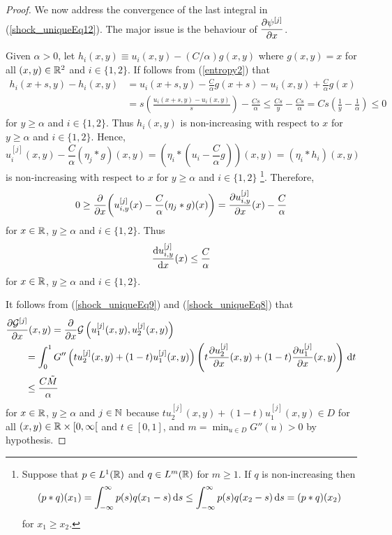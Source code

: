 \begin{proof}
 We now address the convergence of the last integral in
(\ref{shock_uniqueEq12}).  The major issue is the behaviour of
$\displaystyle \pdydx{\psi^{[j]}}{x}$.

Given $\alpha > 0$, let $h_i(x,y) \equiv u_i(x,y) - (C/\alpha) g(x,y)$ where 
$g(x,y) = x$ for all $(x,y) \in \RR^2$ and $i \in\{1,2\}$.  If follows from
(\ref{entropy2}) that
\begin{align*}
h_i(x+s,y) - h_i(x,y)
&= u_i(x+s,y) - \frac{C}{\alpha} g(x+s)
- u_i(x,y) + \frac{C}{\alpha} g(x) \\
&= s\left( \frac{u_i(x+s,y) - u_i(x,y)}{s}\right) - \frac{C s}{\alpha}
\leq \frac{C s}{y} - \frac{C s}{\alpha}
= C s\left( \frac{1}{y} - \frac{1}{\alpha}\right) \leq 0
\end{align*}
for $y\geq \alpha$ and $i \in \{1,2\}$.  Thus $h_i(x,y)$ is non-increasing
with respect to $x$ for $y\geq \alpha$ and $i \in \{1,2\}$.  Hence,
\[
u_i^{[j]}(x,y) - \frac{C}{\alpha} (\eta_j \ast g)(x,y)
= \left(\eta_i \ast ( u_i- \frac{C}{\alpha} g)\right)(x,y)
= \left(\eta_i \ast h_i\right)(x,y)
\]
is non-increasing with respect to $x$ for $y \geq \alpha$ and
$i \in \{1,2\}$ \footnote{
Suppose that $p \in L^1(\RR)$ and $q \in L^m(\RR)$ for $m \geq 1$. 
If $q$ is non-increasing then
\[
(p\ast q)(x_1) = \int_{-\infty}^\infty p(s) q(x_1-s) \dx{s}
\leq \int_{-\infty}^\infty p(s) q(x_2-s) \dx{s}
= (p\ast q)(x_2)
\]
for $x_1 \geq x_2$.}.
Therefore,
\[
0 \geq \pdfdx{\left( u_{i,y}^{[j]}(x) - \frac{C}{\alpha} (\eta_j \ast g)(x)
\right)}{x}
= \pdydx{u_{i,y}^{[j]}}{x}(x) - \frac{C}{\alpha}
\]
for $x \in \RR$, $y\geq \alpha$ and $i \in \{1,2\}$.  Thus
\begin{equation} \label{shock_uniqueEq8}
 \dydx{u_{i,y}^{[j]}}{x}(x) \leq \frac{C}{\alpha}
\end{equation}
for $x \in \RR$, $y \geq \alpha$ and $i \in \{1,2\}$.

It follows from (\ref{shock_uniqueEq9}) and (\ref{shock_uniqueEq8}) that
\begin{align}
&\pdydx{{\cal G}^{[j]}}{x}(x,y)
= \pdfdx{ {\cal G}\left(u_1^{[j]}(x,y),u_2^{[j]}(x,y)\right)}{x} \nonumber \\
&\qquad
= \int_0^1 G''\left(t u_2^{[j]}(x,y) + (1-t) u_1^{[j]}(x,y)\right)
\left(t \pdydx{u_2^{[j]}}{x}(x,y) + (1-t) \pdydx{u_1^{[j]}}{x}(x,y) \right)
\dx{t} \nonumber \\
&\qquad \leq \frac{C \tilde{M}}{\alpha}   \label{shock_uniqueEq13}
\end{align}
for $x\in \RR$, $y \geq \alpha$ and $j\in \NN$ because
$t u_2^{[j]}(x,y) + (1-t) u_1^{[j]}(x,y) \in D$
for all $(x,y) \in \RR \times[0,\infty[$ and $t \in [0,1]$, and
$\displaystyle m = \min_{u \in D} G''(u) > 0$ by hypothesis.


\end{proof}
